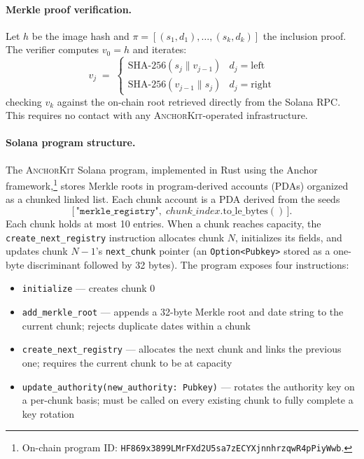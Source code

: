 \documentclass[11pt,a4paper]{article}
\newcommand{\SHA}{\text{SHA-256}}
\newcommand{\AK}{\textsc{AnchorKit}\xspace}
\begin{document}
\paragraph{Merkle proof verification.} Let $h$ be the image hash and $\pi =
[(s_1, d_1), \ldots, (s_k, d_k)]$ the inclusion proof.  The verifier computes
$v_0 = h$ and iterates:
\[
  v_j \;=\; \begin{cases}
    \SHA(s_j \mathbin\| v_{j-1}) & d_j = \mathrm{left} \\
    \SHA(v_{j-1} \mathbin\| s_j) & d_j = \mathrm{right}
  \end{cases}
\]
checking $v_k$ against the on-chain root retrieved directly from the Solana
RPC\@.  This requires no contact with any \AK-operated infrastructure.

\paragraph{Solana program structure.}
The \AK Solana program, implemented in Rust using the Anchor
framework,\footnote{On-chain program ID:
  \texttt{\small HF869x3899LMrFXd2U5sa7zECYXjnnhrzqwR4pPiyWwb}.}
stores Merkle roots in program-derived accounts
(PDAs) organized as a chunked linked list.  Each chunk account is a PDA
derived from the seeds
\[
  \bigl[\,\texttt{"merkle\_registry"},\;
    \mathit{chunk\_index}.\mathrm{to\_le\_bytes}()\,\bigr].
\]
Each chunk holds at most 10 entries.  When a chunk reaches capacity, the
\texttt{create\_next\_registry} instruction allocates chunk $N$, initializes its
fields, and updates chunk $N\!-\!1$'s \texttt{next\_chunk} pointer (an
\texttt{Option<Pubkey>} stored as a one-byte discriminant followed by 32
bytes).  The program exposes four instructions:

\begin{itemize}
  \item \texttt{initialize} --- creates chunk 0
  \item \texttt{add\_merkle\_root} --- appends a 32-byte Merkle root and
    date string to the current chunk; rejects duplicate dates within a chunk
  \item \texttt{create\_next\_registry} --- allocates the next chunk and
    links the previous one; requires the current chunk to be at capacity
  \item \texttt{update\_authority(new\_authority: Pubkey)} --- rotates the
    authority key on a per-chunk basis; must be called on every existing chunk
    to fully complete a key rotation
\end{itemize}
\end{document}
